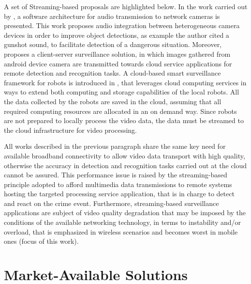 A set of Streaming-based proposals are highlighted below. In the work carried out by \cite{Cheng2014}, a software architecture for audio transmission to network cameras is presented. This work proposes audio integration between heterogeneous camera devices in order to improve object detections, as example the author cited a gunshot sound, to facilitate detection of a dangerous situation.  Moreover, \cite{Paul2013} proposes a client-server surveillance solution, in which images gathered from android device camera are transmitted towards cloud service applications for remote detection and recognition tasks. A cloud-based smart surveillance framework for robots is introduced in \cite{Yang2015}, that leverages cloud computing services in ways to extend both computing and storage capabilities of the local robots. All the data collected by the robots are saved in the cloud, assuming that all required computing resources are allocated in an on demand way. Since robots are not prepared to locally process the video data, the data must be streamed to the cloud infrastructure for video processing. 

All works described in the previous paragraph share the same key need for available broadband connectivity to allow video data transport with high quality, otherwise the accuracy in detection and recognition tasks carried out at the cloud cannot be assured. This performance issue is raised by the streaming-based principle adopted to afford multimedia data transmissions to remote systems hosting the targeted processing service application, that is in charge to detect and react on the crime event. Furthermore, streaming-based surveillance applications are subject of video quality degradation that may be imposed by the conditions of the available networking technology, in terms to instability and/or overload, that is emphasized in wireless scenarios and becomes worst in mobile ones (focus of this work). 

\section{Market-Available Solutions}
 
